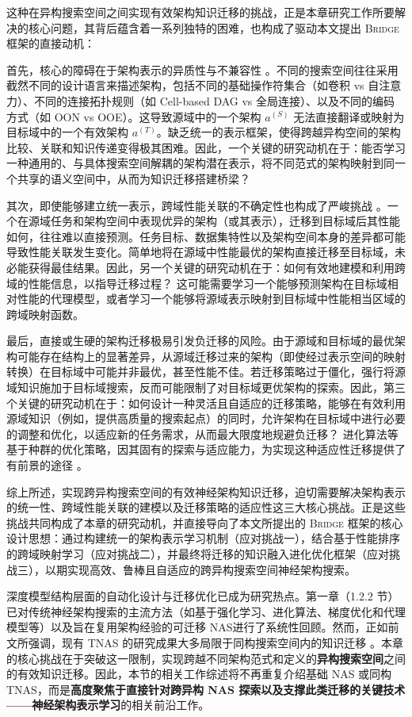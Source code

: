 \documentclass[../main.tex]{subfiles}
\begin{document}
这种在异构搜索空间之间实现有效架构知识迁移的挑战，正是本章研究工作所要解决的核心问题，其背后蕴含着一系列独特的困难，也构成了驱动本文提出 \textsc{Bridge} 框架的直接动机：

首先，核心的障碍在于架构表示的异质性与不兼容性 。不同的搜索空间往往采用截然不同的设计语言来描述架构，包括不同的基础操作符集合（如卷积 vs 自注意力）、不同的连接拓扑规则（如 Cell-based DAG vs 全局连接）、以及不同的编码方式（如 OON vs OOE）。这导致源域中的一个架构 $a^{(S)}$ 无法直接翻译或映射为目标域中的一个有效架构 $a^{(T)}$。缺乏统一的表示框架，使得跨越异构空间的架构比较、关联和知识传递变得极其困难。因此，一个关键的研究动机在于：能否学习一种通用的、与具体搜索空间解耦的架构潜在表示，将不同范式的架构映射到同一个共享的语义空间中，从而为知识迁移搭建桥梁？

其次，即使能够建立统一表示，跨域性能关联的不确定性也构成了严峻挑战 。一个在源域任务和架构空间中表现优异的架构（或其表示），迁移到目标域后其性能如何，往往难以直接预测。任务目标、数据集特性以及架构空间本身的差异都可能导致性能关联发生变化。简单地将在源域中性能最优的架构直接迁移至目标域，未必能获得最佳结果。因此，另一个关键的研究动机在于：如何有效地建模和利用跨域的性能信息，以指导迁移过程？ 这可能需要学习一个能够预测架构在目标域相对性能的代理模型，或者学习一个能够将源域表示映射到目标域中性能相当区域的跨域映射函数。

最后，直接或生硬的架构迁移极易引发负迁移的风险。由于源域和目标域的最优架构可能存在结构上的显著差异，从源域迁移过来的架构（即使经过表示空间的映射转换）在目标域中可能并非最优，甚至性能不佳。若迁移策略过于僵化，强行将源域知识施加于目标域搜索，反而可能限制了对目标域更优架构的探索。因此，第三个关键的研究动机在于：如何设计一种灵活且自适应的迁移策略，能够在有效利用源域知识（例如，提供高质量的搜索起点）的同时，允许架构在目标域中进行必要的调整和优化，以适应新的任务需求，从而最大限度地规避负迁移？ 进化算法等基于种群的优化策略，因其固有的探索与适应能力，为实现这种适应性迁移提供了有前景的途径 。

综上所述，实现跨异构搜索空间的有效神经架构知识迁移，迫切需要解决架构表示的统一性、跨域性能关联的建模以及迁移策略的适应性这三大核心挑战。正是这些挑战共同构成了本章的研究动机，并直接导向了本文所提出的 \textsc{Bridge} 框架的核心设计思想：通过构建统一的架构表示学习机制（应对挑战一），结合基于性能排序的跨域映射学习（应对挑战二），并最终将迁移的知识融入进化优化框架（应对挑战三），以期实现高效、鲁棒且自适应的跨异构搜索空间神经架构搜索。

\label{sec:ch4-3-related-work-review}

深度模型结构层面的自动化设计与迁移优化已成为研究热点。第一章（1.2.2 节）已对传统神经架构搜索的主流方法（如基于强化学习、进化算法、梯度优化和代理模型等）以及旨在复用架构经验的可迁移 NAS进行了系统性回顾。然而，正如前文所强调，现有 TNAS 的研究成果大多局限于同构搜索空间内的知识迁移 。本章的核心挑战在于突破这一限制，实现跨越不同架构范式和定义的\textbf{异构搜索空间}之间的有效知识迁移。因此，本节的相关工作综述将不再重复介绍基础 NAS 或同构 TNAS，而是\textbf{高度聚焦于直接针对跨异构 NAS 探索以及支撑此类迁移的关键技术——神经架构表示学习}的相关前沿工作。
\end{document}
